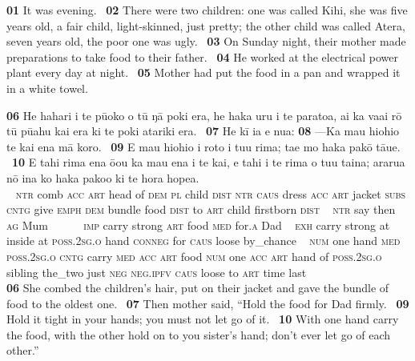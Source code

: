 \medskip\glt
\textbf{\textup{01}} It was evening. ~\textbf{\textup{02}} There were two children: one was called Kihi, she was five years old, a fair child, light-skinned, just pretty; the other child was called Atera, seven years old, the poor one was ugly. ~\textbf{\textup{03}} On Sunday night, their mother made preparations to take food to their father. ~\textbf{\textup{04}} He worked at the electrical power plant every day at night. ~\textbf{05} Mother had put the food in a pan and wrapped it in a white towel.
~

\bigskip\gll
\textbf{\textup{06}} He hahari i te pū{\ꞌ}oko o tū ŋā poki era, he haka uru i te paratoa, {\ꞌ}ai ka va{\ꞌ}ai rō tū pū{\ꞌ}ahu kai era ki te poki {\ꞌ}atariki era. ~\textbf{\textup{07}} He kī ia e nua: \textbf{\textup{08}} —Ka ma{\ꞌ}u hiohio te kai ena mā koro. ~\textbf{\textup{09}} E ma{\ꞌ}u hiohio {\ꞌ}i roto i tu{\ꞌ}u rima; ta{\ꞌ}e mo haka pakō tā{\ꞌ}ue. ~\textbf{\textup{10}} E tahi rima ena ō{\ꞌ}ou ka ma{\ꞌ}u ena i te kai, e tahi i te rima o tu{\ꞌ}u taina; ararua nō {\ꞌ}ina ko haka pako{\ꞌ}o ki te hora hope{\ꞌ}a.\\
~ \textsc{ntr} comb \textsc{acc} \textsc{art} head of \textsc{dem} \textsc{pl} child \textsc{dist} \textsc{ntr} \textsc{caus} dress \textsc{acc} \textsc{art} jacket \textsc{subs} \textsc{cntg} give \textsc{emph} \textsc{dem} bundle food \textsc{dist} to \textsc{art} child firstborn \textsc{dist} ~ \textsc{ntr} say then \textsc{ag} Mum ~ ~~~~\textsc{imp} carry strong \textsc{art} food \textsc{med} for\textsc{.a} Dad ~ \textsc{exh} carry strong at inside at \textsc{poss.2sg.o} hand \textsc{conneg} for \textsc{caus} loose by\_chance ~ \textsc{num} one hand \textsc{med} \textsc{poss.2sg.o} \textsc{cntg} carry \textsc{med} \textsc{acc} \textsc{art} food \textsc{num} one \textsc{acc} \textsc{art} hand of \textsc{poss.2sg.o} sibling the\_two just \textsc{neg} \textsc{neg.ipfv} \textsc{caus} loose to \textsc{art} time last\\
 
\medskip\glt
\textbf{\textup{06}} She combed the children’s hair, put on their jacket and gave the bundle of food to the oldest one. ~\textbf{\textup{07}} Then mother said, “Hold the food for Dad firmly. ~\textbf{\textup{09}} Hold it tight in your hands; you must not let go of it. ~\textbf{\textup{10}} With one hand carry the food, with the other hold on to you sister’s hand; don’t ever let go of each other.”


